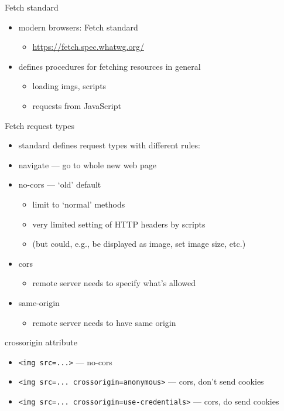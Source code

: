 \begin{frame}{Fetch standard}
    \begin{itemize}
    \item modern browsers: Fetch standard
        \begin{itemize}
        \item {\scriptsize\url{https://fetch.spec.whatwg.org/}}
        \end{itemize}
    \item defines procedures for fetching resources in general
        \begin{itemize}
        \item loading imgs, scripts
        \item requests from JavaScript
        \end{itemize}
    \end{itemize}
\end{frame}

\begin{frame}{Fetch request types}
    \begin{itemize}
    \item standard defines request types with different rules:
    \item navigate --- go to whole new web page
    \item no-cors --- `old' default
        \begin{itemize}
        \item limit to `normal' methods
        \item very limited setting of HTTP headers by scripts
        \item {} (but could, e.g., be displayed as image, set image size, etc.)
        \end{itemize}
    \item cors
        \begin{itemize}
        \item remote server needs to specify what's allowed
        \end{itemize}
    \item same-origin
        \begin{itemize}
        \item remote server needs to have same origin
        \end{itemize}
    \end{itemize}
\end{frame}

\begin{frame}[fragile]{crossorigin attribute}
    \begin{itemize}
    \item \verb|<img src=...>| --- no-cors
    \item \verb|<img src=... crossorigin=anonymous>| --- cors, don't send cookies
    \item \verb|<img src=... crossorigin=use-credentials>| --- cors, do send cookies
    \end{itemize}
\end{frame}

